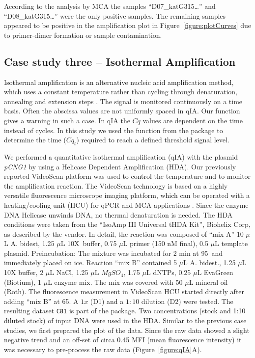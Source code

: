 According to the analysis by MCA the samples ``D07\_katG315\ldots'' and 
``D08\_katG315\ldots'' were the only positive samples. The remaining samples 
appeared to be positive in the amplification plot in 
Figure~\ref{figure:plotCurves} due to primer-dimer formation or sample 
contamination.

\subsection{Case study three -- Isothermal Amplification}

Isothermal amplification is an alternative nucleic acid amplification method, 
which uses a constant temperature rather than cycling through denaturation, 
annealing and extension steps \citep{rodiger_nucleic_2014}. The signal is 
monitored continuously on a time basis. Often the abscissa values are not 
uniformly spaced in qIA. Our  function gives a warning in such 
a case. In qIA the $Cq$ values are dependent on the time instead of cycles. In 
this study we used the  function from the  package 
to determine the time ($Cq_{t}$) required to reach a defined threshold signal 
level.

We performed a quantitative isothermal amplification (qIA) with the plasmid 
\textit{pCNG1} by using a Helicase Dependent Amplification (HDA). Our previously 
reported VideoScan platform \citep{rodiger_highly_2013} was used to control the 
temperature and to monitor the amplification reaction. The VideoScan technology 
is based on a highly versatile fluorescence microscope imaging platform, which 
can be operated with a heating/cooling unit (HCU) for qPCR and MCA applications 
\citep{roediger_RJ_2013, rodiger_highly_2013}. Since the enzyme DNA Helicase 
unwinds DNA, no thermal denaturation is needed. The HDA conditions were taken 
from the ``IsoAmp III Universal tHDA Kit'', Biohelix Corp, as described by the 
vendor. In detail, the reaction was composed of ``mix A'' 10 $\mu$L A. bidest, 
1.25 $\mu$L 10X~buffer, 0.75 $\mu$L primer (150 nM final), 0.5 $\mu$L template 
plasmid. Preincubation: The mixture was incubated for 2 min at 
95\textcelsius~and immediately placed on ice. Reaction ``mix B'' contained 5 
$\mu$L A. bidest., 1.25 $\mu$L 10X buffer, 2 $\mu$L NaCl, 1.25 $\mu$L 
$MgSO_{4}$, 1.75 $\mu$L dNTPs, 0.25 $\mu$L EvaGreen (Biotium), 1 $\mu$L enzyme 
mix. The mix was covered with 50 $\mu$L mineral oil (Roth). The fluorescence 
measurement in VideoScan HCU started directly after adding ``mix B'' at 
65\textcelsius. A $1x$ (D1) and a $1:10$ dilution (D2) were tested. The 
resulting dataset \texttt{C81} is part of the  package. Two 
concentrations (stock and 1:10 diluted stock) of input DNA were used in the HDA. 
Similar to the previous case studies, we first prepared the plot of the data. 
Since the raw data showed a slight negative trend and an off-set of circa 0.45 
MFI (mean fluorescence intensity) it was necessary 
to pre-process the raw data (Figure~\ref{figure:qIA}A).

